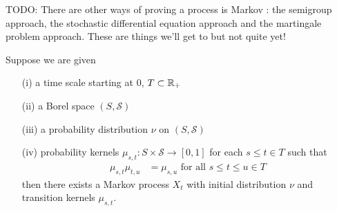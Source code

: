 TODO: There are other ways of proving a process is Markov : the
semigroup approach, the stochastic differential equation approach and
the martingale problem approach.  These are things we'll get to but
not quite yet!

\begin{thm}\label{ExistenceMarkovProcess}Suppose we are given
\begin{itemize}
\item[(i)] a  time scale starting at $0$, $T \subset \mathbb{R}_+$ 
\item[(ii)]a Borel space $(S, \mathcal{S})$ 
\item[(iii)]a probability distribution $\nu$ on $(S, \mathcal{S})$
\item[(iv)]probability kernels $\mu_{s,t} : S \times
  \mathcal{S} \to [0,1]$ for each $s \leq t \in T$ such that 
\begin{align*}
\mu_{s,t} \mu_{t,u} &= \mu_{s,u} \text{ for all $s\leq
  t\leq u \in T$}
\end{align*}
then there exists a Markov process $X_t$ with initial distribution
$\nu$ and transition kernels $\mu_{s,t}$.
\end{itemize} 
\end{thm}
